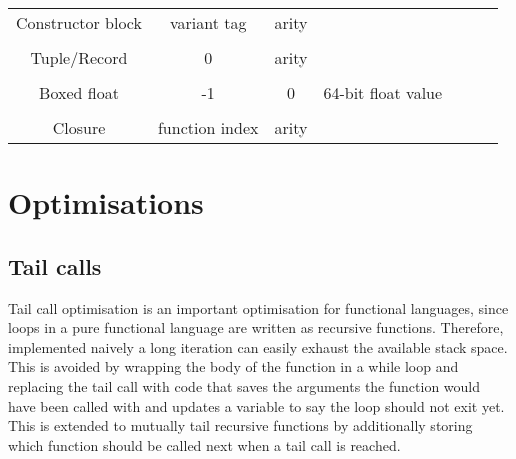   \begin{tabular}{c|c|c|c|c|c|m{2cm}|} \cline{2-7}
Constructor block &   variant tag  & arity &   \multicolumn{3}{c}{\hspace{2cm}{elements} } &  \\ \cline{2-7} \multicolumn{1}{c}{}  \\ \cline{2-7}
Tuple/Record &   0  & arity &   \multicolumn{3}{c}{\hspace{2cm}{elements}} &  \\ \cline{2-7} \multicolumn{1}{c}{}  \\ \cline{2-4}
Boxed float &  -1 & 0 & 64-bit float value      \\ \cline{2-4} \multicolumn{1}{c}{}  \\ \cline{2-7}
Closure & function index  & arity &   \multicolumn{3}{c}{\hspace{2cm}{free variables}} &  \\ \cline{2-7} 
\end{tabular}


\section{Optimisations}
\subsection{Tail calls}
Tail call optimisation is an important optimisation for functional languages, since loops in a pure functional language are written as recursive functions. Therefore, implemented naively a long iteration can easily exhaust the available stack space. This is avoided by wrapping the body of the function in a while loop and replacing the tail call with code that saves the arguments the function would have been called with and updates a variable to say the loop should not exit yet. This is extended to mutually tail recursive functions by additionally storing which function should be called next when a tail call is reached.


